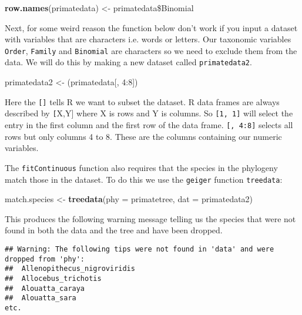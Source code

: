 \documentclass[11pt]{article}
\newcommand{\KeywordTok}[1]{\textcolor[rgb]{0.13,0.29,0.53}{\textbf{{#1}}}}
\newcommand{\DataTypeTok}[1]{\textcolor[rgb]{0.13,0.29,0.53}{{#1}}}
\newcommand{\DecValTok}[1]{\textcolor[rgb]{0.00,0.00,0.81}{{#1}}}
\newcommand{\StringTok}[1]{\textcolor[rgb]{0.31,0.60,0.02}{{#1}}}
\newcommand{\NormalTok}[1]{{#1}}
\begin{document}
\begin{snugshade}
\begin{Highlighting}[]
\KeywordTok{row.names}\NormalTok{(primatedata) <-}\StringTok{ }\NormalTok{primatedata\$Binomial}
\end{Highlighting}
\end{snugshade}

Next, for some weird reason the function below don't work if you input a dataset with variables that are characters i.e. words or letters. Our taxonomic variables \texttt{Order}, \texttt{Family} and \texttt{Binomial} are characters so we need to exclude them from the data. We will do this by making a new dataset called \texttt{primatedata2}.

\begin{snugshade}
\begin{Highlighting}[]
\NormalTok{primatedata2 <-}\StringTok{ }\NormalTok{(primatedata[,} \DecValTok{4:8}\NormalTok{])}
\end{Highlighting}
\end{snugshade}

Here the \texttt{[]} tells R we want to subset the dataset. R data frames are always described by \texttt[X,Y] where X is rows and Y is columns. So \texttt{[1, 1]} will select the entry in the first column and the first row of the data frame. \texttt{[, 4:8]} selects all rows but only columns 4 to 8. These are the columns containing our numeric variables.

The \texttt{fitContinuous} function also requires that the species in the phylogeny match those in the dataset. To do this we use the \texttt{geiger} function \texttt{treedata}:

\begin{snugshade}
\begin{Highlighting}[]
\NormalTok{match.species <-}\StringTok{ }\KeywordTok{treedata}\NormalTok{(}\DataTypeTok{phy = }\NormalTok{primatetree,} \DataTypeTok{dat = }\NormalTok{primatedata2)}
\end{Highlighting}
\end{snugshade}

This produces the following warning message telling us the species that were not found in both the data and the tree and have been dropped.
\begin{verbatim}
## Warning: The following tips were not found in 'data' and were dropped from 'phy':
##  Allenopithecus_nigroviridis
##  Allocebus_trichotis
##  Alouatta_caraya
##  Alouatta_sara
etc.
\end{verbatim}
\end{document}
